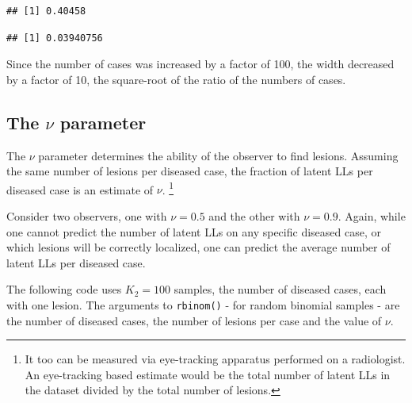 \documentclass[
]{book}
\newenvironment{Shaded}{\begin{snugshade}}{\end{snugshade}}
\newcommand{\DecValTok}[1]{\textcolor[rgb]{0.00,0.00,0.81}{#1}}
\newcommand{\NormalTok}[1]{#1}
\newcommand{\SpecialCharTok}[1]{\textcolor[rgb]{0.00,0.00,0.00}{#1}}
\begin{document}
\begin{Shaded}
\end{Shaded}

\begin{verbatim}
## [1] 0.40458
\end{verbatim}

\begin{Shaded}
\end{Shaded}

\begin{verbatim}
## [1] 0.03940756
\end{verbatim}

Since the number of cases was increased by a factor of 100, the width decreased by a factor of 10, the square-root of the ratio of the numbers of cases.

\hypertarget{rsm-summary-nu-parameter}{%
\subsection{\texorpdfstring{The \(\nu\) parameter}{The \textbackslash nu parameter}}\label{rsm-summary-nu-parameter}}

The \(\nu\) parameter determines the ability of the observer to find lesions. Assuming the same number of lesions per diseased case, the fraction of latent LLs per diseased case is an estimate of \(\nu\). \footnote{It too can be measured via eye-tracking apparatus performed on a radiologist. An eye-tracking based estimate would be the total number of latent LLs in the dataset divided by the total number of lesions.}

Consider two observers, one with \(\nu = 0.5\) and the other with \(\nu = 0.9\). Again, while one cannot predict the number of latent LLs on any specific diseased case, or which lesions will be correctly localized, one can predict the average number of latent LLs per diseased case.

The following code uses \(K_2 = 100\) samples, the number of diseased cases, each with one lesion. The arguments to \texttt{rbinom()} - for random binomial samples - are the number of diseased cases, the number of lesions per case and the value of \(\nu\).
\end{document}
